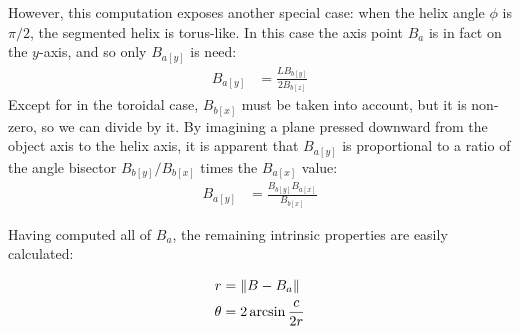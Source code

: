 \documentclass{svproc}
\DeclarePairedDelimiter{\norm}{\lVert}{\rVert}
\begin{document}
However, this computation exposes another special case: when the
helix angle $\phi$ is $\pi /2$, the segmented helix is
torus-like. In this case the axis point $B_a$ is in fact
on the $y$-axis, and so only $B_{a[y]}$ is need:
\begin{align}
  B_{a[y]} &=  \frac{L B_{b[y]}}{2 B_{b[z]}}
\end{align}
Except for in the toroidal case,  $B_{b[x]}$ must be taken into
account, but it is non-zero, so we can divide by it.
By imagining a plane pressed downward from the
object axis to the helix axis, it is apparent that $B_{a[y]}$
is proportional to a ratio of the angle bisector
$B_{b[y]}/B_{b[x]}$ times the $B_{a[x]}$ value:
\begin{align}
  B_{a[y]} &=  \frac{ B_{b[y]} B_{a[x]}}{ B_{b[x]}}
\end{align}

Having computed all of $B_a$, the remaining intrinsic properties are easily
calculated:

\begin{align}
  r &= \norm{B - B_a}  \\
  \theta &= 2 \arcsin{\frac{c}{2r}}
\end{align}






\end{document}
